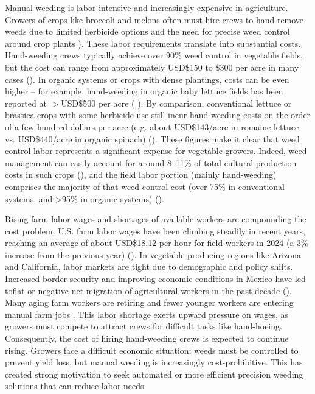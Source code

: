 \documentclass[letterpaper]{report}
\begin{document}
Manual weeding is labor-intensive and increasingly expensive in agriculture. Growers of crops like broccoli and melons often must hire crews to hand-remove weeds due to limited herbicide options and the need for precise weed control around crop plants \cite{American-Society-of-Agronomy2018-ad}). These labor requirements translate into substantial costs. Hand-weeding crews typically achieve over 90\% weed control in vegetable fields, but the cost can range from approximately USD\$150 to \$300 per acre in many cases (\cite{American-Society-of-Agronomy2018-ad}). In organic systems or crops with dense plantings, costs can be even higher – for example, hand-weeding in organic baby lettuce fields has been reported at $>$USD\$500 per acre (\cite{UnknownUnknown-zl} \cite{Kushal2024-jt}). By comparison, conventional lettuce or brassica crops with some herbicide use still incur hand-weeding costs on the order of a few hundred dollars per acre (e.g. about USD\$143/acre in romaine lettuce vs. USD\$440/acre in organic spinach) (\cite{University-of-CaliforniaUnknown-qo}). These figures make it clear that weed control labor represents a significant expense for vegetable growers. Indeed, weed management can easily account for around 8–11\% of total cultural production costs in such crops (\cite{University-of-CaliforniaUnknown-qo}), and the field labor portion (mainly hand-weeding) comprises the majority of that weed control cost (over 75\% in conventional systems, and >95\% in organic systems) (\cite{University-of-CaliforniaUnknown-qo}).

Rising farm labor wages and shortages of available workers are compounding the cost problem. U.S. farm labor wages have been climbing steadily in recent years, reaching an average of about USD\$18.12 per hour for field workers in 2024 (a 3\% increase from the previous year) (\cite{USDA2024-pq}). In vegetable-producing regions like Arizona and California, labor markets are tight due to demographic and policy shifts. Increased border security and improving economic conditions in Mexico have led toflat or negative net migration of agricultural workers in the past decade (\cite{University-of-CaliforniaUnknown-qo}). Many aging farm workers are retiring and fewer younger workers are entering manual farm jobs . This labor shortage exerts upward pressure on wages, as growers must compete to attract crews for difficult tasks like hand-hoeing. Consequently, the cost of hiring hand-weeding crews is expected to continue rising. Growers face a difficult economic situation: weeds must be controlled to prevent yield loss, but manual weeding is increasingly cost-prohibitive. This has created strong motivation to seek automated or more efficient precision weeding solutions that can reduce labor needs.
\end{document}
